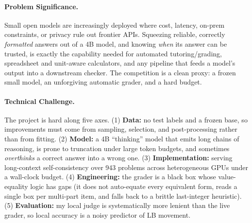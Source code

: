 \documentclass{article}
\begin{document}
\paragraph{Problem Significance.}
Small open models are increasingly deployed where cost, latency, on-prem
constraints, or privacy rule out frontier APIs. Squeezing reliable, correctly
\emph{formatted} answers out of a 4B model, and knowing \emph{when} its answer can be
trusted, is exactly the capability needed for automated tutoring/grading,
spreadsheet and unit-aware calculators, and any pipeline that feeds a model's
output into a downstream checker. The competition is a clean proxy: a frozen small
model, an unforgiving automatic grader, and a hard budget.

\paragraph{Technical Challenge.}
The project is hard along five axes. (1) \textbf{Data:} no test labels and a frozen
base, so improvements must come from sampling, selection, and post-processing rather
than from fitting. (2) \textbf{Model:} a 4B ``thinking'' model that emits long
chains of reasoning, is prone to truncation under large token budgets, and
sometimes \emph{overthinks} a correct answer into a wrong one. (3) \textbf{Implementation:}
serving long-context self-consistency over 943 problems across heterogeneous GPUs
under a wall-clock budget. (4) \textbf{Engineering:} the grader is a black box whose
value-equality logic has gaps (it does not auto-equate every equivalent form, reads
a single box per multi-part item, and falls back to a brittle last-integer
heuristic). (5) \textbf{Evaluation:} my local judge is systematically more lenient
than the live grader, so local accuracy is a noisy predictor of LB movement.
\end{document}
